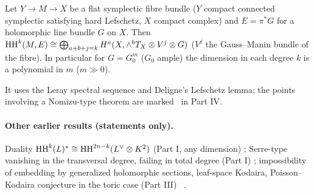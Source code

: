 \begin{thm}\label{p5:thm:L}
Let $Y\to M\to X$ be a flat symplectic fibre bundle ($Y$ compact connected symplectic satisfying hard Lefschetz, $X$ compact complex) and $E=\pi^*G$ for a holomorphic line bundle $G$ on $X$. Then $\mathrm{HH}^k(M,E)\cong\bigoplus_{a+b+j=k}H^a(X,\wedge^bT_X\otimes V^j\otimes G)$ ($V^j$ the Gauss--Manin bundle of the fibre). In particular for $G=G_0^m$ ($G_0$ ample) the dimension in each degree $k$ is a polynomial in $m$ ($m\gg0$).
\end{thm}
It uses the Leray spectral sequence and Deligne's Lefschetz lemma; the points involving a Nomizu-type theorem are marked \tQ\ in Part IV.

\paragraph{Other earlier results (statements only).} Duality $\mathrm{HH}^k(L)^*\cong\mathrm{HH}^{2n-k}(L^\vee\otimes K^2)$ (Part I, any dimension) \tP; Serre-type vanishing in the transversal degree, failing in total degree (Part I) \tP; impossibility of embedding by generalized holomorphic sections, leaf-space Kodaira, Poisson--Kodaira conjecture in the toric case (Part III) \tP\ \tK.


